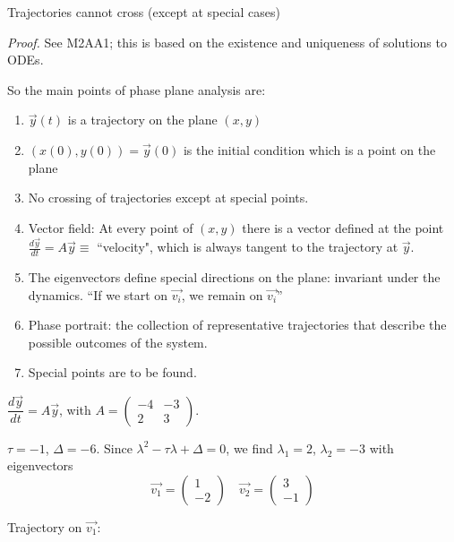\documentclass[10pt]{scrartcl}
\renewcommand{\l}{\lambda}
\begin{document}
\begin{proposition}
Trajectories cannot cross (except at special cases)	
\end{proposition}
\emph{Proof.} See \textsc{M2AA1}; this is based on the existence and uniqueness of solutions to ODEs. 




So the main points of phase plane analysis are:
\begin{enumerate}
\item $\vec{y}(t)$ is a trajectory on the plane $(x,y)$	
\item $(x(0),y(0)) = \vec{y}(0)$ is the initial condition which is a point on the plane
\item No crossing of trajectories except at special points.
\item Vector field: At every point of $(x,y)$ there is a vector defined at the point $\frac{d\vec{y}}{dt} = A\vec{y} \equiv$ ``velocity", which is always tangent to the trajectory at $\vec{y}$.
\item The eigenvectors define special directions on the plane: invariant under the dynamics. ``If we start on $\vec{v_i}$, we remain on $\vec{v_i}$''
\item Phase portrait: the collection of representative trajectories that describe the possible outcomes of the system.
\item Special points are to be found. 
\end{enumerate}

\begin{example}
$\dfrac{d\vec{y}}{dt} = A\vec{y}$, with $A = \begin{pmatrix}
  -4 & -3 \\ 2 & 3
\end{pmatrix}$.

$\tau = -1$, $\Delta = -6.$ Since $\l^2 -\tau \l + \Delta = 0$, we find $\l_1 = 2$, $\l_2 = -3$ with eigenvectors
\[
  \vec{v_1} = \begin{pmatrix}
  1 \\ -2
\end{pmatrix}
\quad \vec{v_2}
= \begin{pmatrix}
  3\\ -1
\end{pmatrix}
\]




Trajectory on $\vec{v_1}$: 



	
\end{example}
\end{document}
